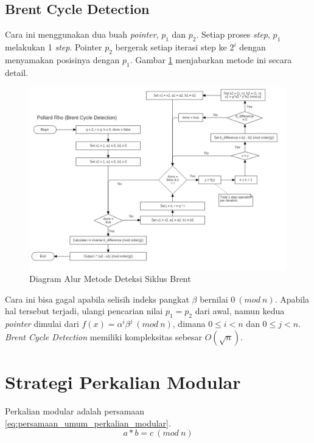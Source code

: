 \subsection{Brent Cycle Detection}
Cara ini menggunakan dua buah \textit{pointer}, $ p_1 $ dan $ p_2 $. Setiap proses \textit{step}, $ p_1 $ melakukan 1 \textit{step}. Pointer $ p_2 $ bergerak setiap iterasi step ke $ 2^i $ dengan menyamakan posisinya dengan $ p_1 $. Gambar \ref{fig:brent_pollard_rho} menjabarkan metode ini secara detail.
\begin{figure}[h!]
	\Centering
	\includegraphics[scale=0.4,angle=90]{bab2/img/pollard-rho-brent}
	\caption {Diagram Alur Metode Deteksi Siklus Brent}
	\label{fig:brent_pollard_rho}
\end{figure}

Cara ini bisa gagal apabila selisih indeks pangkat $ \beta $ bernilai $ 0\ (mod\ n) $. Apabila hal tersebut terjadi, ulangi pencarian nilai $ p_1 = p_2 $ dari awal, namun kedua \textit{pointer} dimulai dari $ f(x)=\alpha^i \beta^j\ (mod\ n) $, dimana $ 0 \leq i < n $ dan $ 0 \leq j < n $. \textit{Brent Cycle Detection} memiliki kompleksitas sebesar $ O(\sqrt{n}) $.

\section{Strategi Perkalian Modular}

Perkalian modular adalah persamaan \eqref{eq:persamaan_umum_perkalian_modular}.
\begin{equation}
a*b=c\ (mod\ n)
\label{eq:persamaan_umum_perkalian_modular}
\end{equation}

